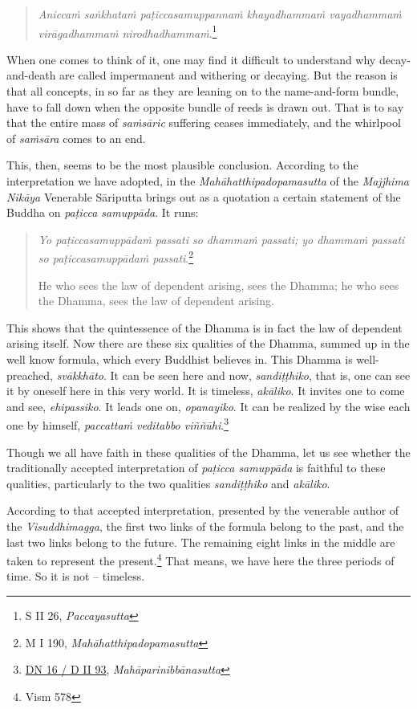 \begin{quote}
\emph{Aniccaṁ saṅkhataṁ paṭiccasamuppannaṁ khayadhammaṁ vayadhammaṁ virāgadhammaṁ nirodhadhammaṁ}.\footnote{S II 26, \emph{Paccayasutta}}
\end{quote}

When one comes to think of it, one may find it difficult to understand why decay-and-death are called impermanent and withering or decaying. But the reason is that all concepts, in so far as they are leaning on to the name-and-form bundle, have to fall down when the opposite bundle of reeds is drawn out. That is to say that the entire mass of \emph{saṁsāric} suffering ceases immediately, and the whirlpool of \emph{saṁsāra} comes to an end.

This, then, seems to be the most plausible conclusion. According to the interpretation we have adopted, in the \emph{Mahāhatthipadopamasutta} of the \emph{Majjhima Nikāya} Venerable Sāriputta brings out as a quotation a certain statement of the Buddha on \emph{paṭicca samuppāda}. It runs:

\begin{quote}
\emph{Yo paṭiccasamuppādaṁ passati so dhammaṁ passati; yo dhammaṁ passati so paṭiccasamuppādaṁ passati}.\footnote{M I 190, \emph{Mahāhatthipadopamasutta}}

He who sees the law of dependent arising, sees the Dhamma; he who sees the Dhamma, sees the law of dependent arising.
\end{quote}

This shows that the quintessence of the Dhamma is in fact the law of dependent arising itself. Now there are these six qualities of the Dhamma, summed up in the well know formula, which every Buddhist believes in. This Dhamma is well-preached, \emph{svākkhāto}. It can be seen here and now, \emph{sandiṭṭhiko}, that is, one can see it by oneself here in this very world. It is timeless, \emph{akāliko}. It invites one to come and see, \emph{ehipassiko}. It leads one on, \emph{opanayiko}. It can be realized by the wise each one by himself, \emph{paccattaṁ veditabbo viññūhi}.\footnote{\href{https://suttacentral.net/dn16/pli/ms}{DN 16 / D II 93}, \emph{Mahāparinibbānasutta}}

Though we all have faith in these qualities of the Dhamma, let us see whether the traditionally accepted interpretation of \emph{paṭicca samuppāda} is faithful to these qualities, particularly to the two qualities \emph{sandiṭṭhiko} and \emph{akāliko}.

According to that accepted interpretation, presented by the venerable author of the \emph{Visuddhimagga}, the first two links of the formula belong to the past, and the last two links belong to the future. The remaining eight links in the middle are taken to represent the present.\footnote{Vism 578} That means, we have here the three periods of time. So it is not -- timeless.


